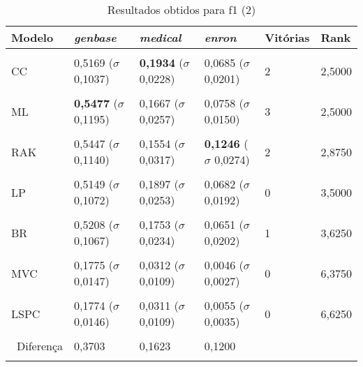 \begin{table}[htbp]
	\centering
	\caption{Resultados obtidos para f1 (2)}
		\begin{tabular}
        { p{0.88in} p{0.88in} p{0.88in} p{0.88in} p{0.88in} p{0.88in} }
        
        \hline
Modelo & \textit{genbase} & \textit{medical} & \textit{enron} & \textbf{Vitórias} & \textbf{Rank} \\ 
\hline \\

CC & 0,5169 \newline ($\sigma$ 0,1037) & \textbf{0,1934} \newline ($\sigma$ 0,0228) & 0,0685 \newline ($\sigma$ 0,0201) & 2 & 2,5000 \\ \\
ML & \textbf{0,5477} \newline ($\sigma$ 0,1195) & 0,1667 \newline ($\sigma$ 0,0257) & 0,0758 \newline ($\sigma$ 0,0150) & 3 & 2,5000 \\ \\
RAK & 0,5447 \newline ($\sigma$ 0,1140) & 0,1554 \newline ($\sigma$ 0,0317) & \textbf{0,1246} \newline ($\sigma$ 0,0274) & 2 & 2,8750 \\ \\
LP & 0,5149 \newline ($\sigma$ 0,1072) & 0,1897 \newline ($\sigma$ 0,0253) & 0,0682 \newline ($\sigma$ 0,0192) & 0 & 3,5000 \\ \\
BR & 0,5208 \newline ($\sigma$ 0,1067) & 0,1753 \newline ($\sigma$ 0,0234) & 0,0651 \newline ($\sigma$ 0,0202) & 1 & 3,6250 \\ \\
MVC & 0,1775 \newline ($\sigma$ 0,0147) & 0,0312 \newline ($\sigma$ 0,0109) & 0,0046 \newline ($\sigma$ 0,0027) & 0 & 6,3750 \\ \\
LSPC & 0,1774 \newline ($\sigma$ 0,0146) & 0,0311 \newline ($\sigma$ 0,0109) & 0,0055 \newline ($\sigma$ 0,0035) & 0 & 6,6250 \\ \\

\hline \ 
 Diferença & 0,3703 & 0,1623 & 0,1200 &  &  \\ 
\hline \\

        \end{tabular}
	\label{tab:metricsForF1_2}
\end{table}
